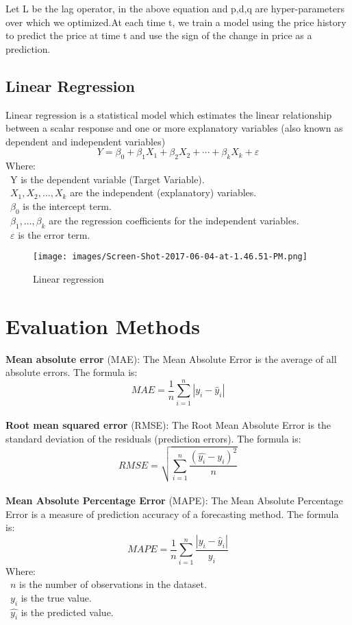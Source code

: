 \documentclass{ieeeojies}
\begin{document}
Let L be the lag operator, in the above equation and p,d,q are hyper-parameters over which we optimized.At each time t, we train a model using the price history to predict the price at time t and use the sign of the change in price as a prediction.
\subsection{Linear Regression}
 Linear regression is a statistical model which estimates the linear relationship between a scalar response and one or more explanatory variables (also known as dependent and independent variables)
 \[Y=\beta_0+\beta_1X_1+\beta_2X_2+\cdots+\beta_kX_k+\varepsilon\]
Where:\\
	\indent\textbullet\ Y is the dependent variable (Target Variable).\\
	\indent\textbullet\ \(X_1, X_2, \ldots, X_k\) are the independent (explanatory) variables.\\
	\indent\textbullet\ \(\beta_0\) is the intercept term.\\
	\indent\textbullet\ \(\beta_1,..., \beta_k\) are the regression coefficients for the independent variables.\\
	\indent\textbullet\ \(\varepsilon\) is the error term.

\begin{figure}[H] %
    \centering
    \texttt{[image: images/Screen-Shot-2017-06-04-at-1.46.51-PM.png]}
    \caption{Linear regression}
    \label{fig:linear_regression}
\end{figure}

\section{Evaluation Methods}
\textbf{Mean absolute error} (MAE): 
The Mean Absolute Error is the average of all absolute errors. The formula is:\\
\[MAE = \frac{1}{n} \sum_{i=1}^{n} | y_i - \hat{y}_i |\]\\
  
\textbf{Root mean squared error} (RMSE): The Root Mean Absolute Error is the standard deviation of the residuals (prediction errors). The formula is: \\
\[RMSE=\sqrt{\sum_{i=1}^{n} \frac{(\hat{y_i}-y_i )^2}{n} }\]\\
\textbf{Mean Absolute Percentage Error} (MAPE): The Mean Absolute Percentage Error is a measure of prediction accuracy of a forecasting method. The formula is:  \\
\[MAPE=\frac{1}{n}\sum_{i=1}^{n} \frac{|y_i-\hat{y}_i|}{y_i}\]
Where: \\
	\indent\textbullet\ \(n\) is the number of observations in the dataset.\\
	\indent\textbullet\ \(y_i\)  is the true value.\\
	\indent\textbullet\ \(\hat{y_i}\) is the predicted value.
\end{document}
